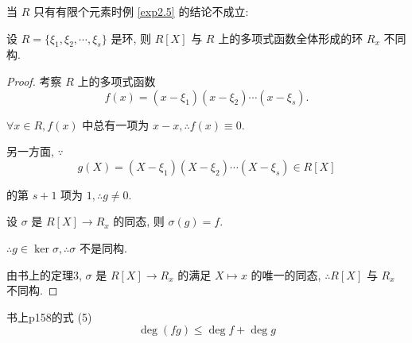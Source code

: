 \documentclass[UTF8]{ctexart}
\begin{document}
当 $R$ 只有有限个元素时例 \ref{exp2.5} 的结论不成立:
\begin{example}
    设 $R=\{\xi_1,\xi_2,\cdots,\xi_s\}$ 是环, 则 $R[X]$ 与 $R$ 上的多项式函数全体形成的环 $R_x$ 不同构.
\end{example}
\begin{proof}
    考察 $R$ 上的多项式函数
    \[f(x)=(x-\xi_1)(x-\xi_2)\cdots(x-\xi_s).\]

    $\forall x\in R,f(x)$ 中总有一项为 $x-x,\therefore f(x)\equiv0$.

    另一方面, $\because$
    \[g(X)=(X-\xi_1)(X-\xi_2)\cdots(X-\xi_s)\in R[X]\]

    的第 $s+1$ 项为 $1,\therefore g\neq0$.

    设 $\sigma$ 是 $R[X]\to R_x$ 的同态, 则 $\sigma(g)=f$.
    
    $\therefore g\in\ker\sigma,\therefore\sigma$ 不是同构.

    由书上的定理3, $\sigma$ 是 $R[X]\to R_x$ 的满足 $X\mapsto x$ 的唯一的同态, $\therefore R[X]$ 与 $R_x$ 不同构.
\end{proof}
书上p158的式 (5)
\[\deg(fg)\leq\deg f+\deg g\]
\end{document}
